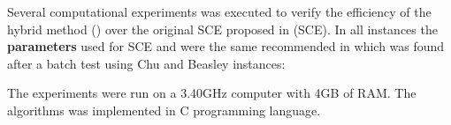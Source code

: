 Several computational experiments was executed to verify the efficiency of the
hybrid method (\scecore) over the original SCE proposed in
\cite{baroni2015shuffled} (SCE).
In all instances the {\bf parameters} used for SCE and \scecore were the same recommended
in \cite{baroni2015shuffled} which was found after a batch test using Chu and Beasley instances:

\begin{center}
  
\end{center}

The experiments were run on a 3.40GHz computer with 4GB of RAM.
The algorithms was implemented in C programming language.
